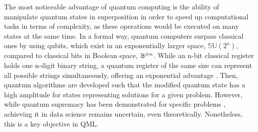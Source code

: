 \documentclass{article}
\begin{document}
The most noticeable advantage of quantum computing is the ability of manipulate quantum states in superposition in order to speed up computational tasks in terms of complexity, as these operations would be executed on many states at the same time. In a formal way, quantum computers surpass classical ones by using qubits, which exist in an exponentially larger space, $\mathbb{SU}(2^n)$, compared to classical bits in Boolean space, $\mathbb{B}^{\tens{} n} $. While an n-bit classical register holds one n-digit binary string, a quantum register of the same size can represent all possible strings simultaneously, offering an exponential advantage \cite{Nielsen_Chuang_2010}. Then, quantum algorithms are developed such that the modified quantum state has a high amplitude for states representing solutions for a given problem. 
However, while quantum supremacy has been demonstrated for specific problems \cite{Arute2019}, achieving it in data science remains uncertain, even theoretically. Nonetheless, this is a key objective in QML.
\end{document}
